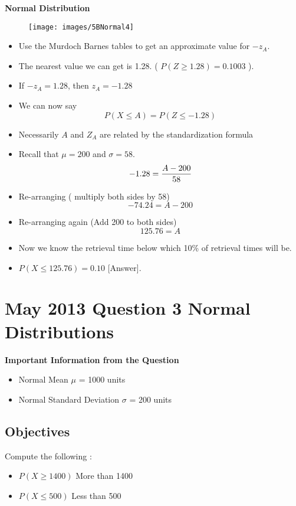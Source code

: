 \noindent \textbf{Normal Distribution}
\begin{figure}
	\centering
	\texttt{[image: images/5BNormal4]}
	\caption{}
	\label{fig:5BNormal4}
\end{figure}


\begin{itemize}
		\item Use the Murdoch Barnes tables to get an approximate value for $-z_A$.
		\item The nearest value we can get is 1.28. ( $P( Z \geq 1.28) = 0.1003$ ).
		\item If $-z_A = 1.28$, then $z_A=-1.28$
		\item We can now say
		\[ P(X \leq A) = P(Z \leq -1.28) \]
		
		\item Necessarily $A$ and $Z_A$ are related by the standardization formula
		\item Recall that $\mu = 200$ and $\sigma = 58$.
		\[ -1.28  = {A - 200 \over 58} \]
		\item Re-arranging ( multiply both sides by 58)
		\[ -74.24  = A - 200 \]
		\item Re-arranging again (Add 200 to both sides)
		\[ 125.76 =  A \]

		\item Now we know the retrieval time below which 10\% of retrieval times will be.
		\item $P(X \leq 125.76) = 0.10$ [Answer].
	\end{itemize}




\section*{May 2013 Question 3 Normal Distributions}

\noindent \textbf{Important Information from the Question}
\begin{itemize}
	\item Normal Mean $\mu$ = 1000 units
	\item Normal Standard Deviation $\sigma$ = 200 units 
\end{itemize}

\subsection*{Objectives}
Compute the following : 
\begin{itemize}
	\item $P(X \geq 1400 )$ More than 1400
	\item $P(X \leq 500)$ Less than 500
\end{itemize}


